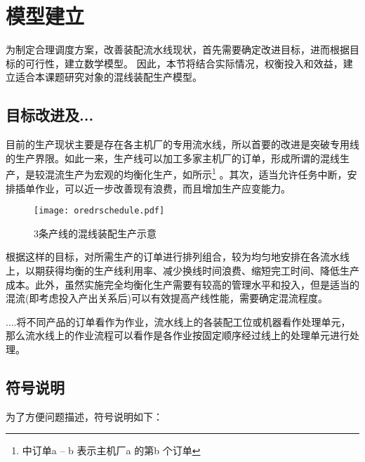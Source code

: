 \section{模型建立}
为制定合理调度方案，改善装配流水线现状，首先需要确定改进目标，进而根据目标的可行性，建立数学模型。
因此，本节将结合实际情况，权衡投入和效益，建立适合本课题研究对象的混线装配生产模型。
\subsection{目标改进及...}
目前的生产现状主要是存在各主机厂的专用流水线，所以首要的改进是突破专用线的生产界限。如此一来，生产线可以加工多家主机厂的订单，形成所谓的混线生产，是较混流生产为宏观的均衡化生产，如所示\footnote{中订单a -- b 表示主机厂a 的第b 个订单}
。其次，适当允许任务中断，安排插单作业，可以近一步改善现有浪费，而且增加生产应变能力。
\begin{figure}[h]
\centering
\texttt{[image: oredrschedule.pdf]}
\caption{3条产线的混线装配生产示意\label{fig:orderschedule}}
\end{figure}

根据这样的目标，对所需生产的订单进行排列组合，较为均匀地安排在各流水线上，以期获得均衡的生产线利用率、减少换线时间浪费、缩短完工时间、降低生产成本。此外，虽然实施完全均衡化生产需要有较高的管理水平和投入，但是适当的混流(即考虑投入产出关系后)可以有效提高产线性能，需要确定混流程度。

....将不同产品的订单看作为作业，流水线上的各装配工位或机器看作处理单元，那么流水线上的作业流程可以看作是各作业按固定顺序经过线上的处理单元进行处理。

\subsection{符号说明}
为了方便问题描述，符号说明如下：

